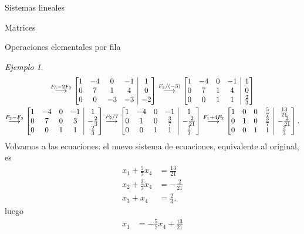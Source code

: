 \documentclass[a4paper,12pt,twoside,spanish,reqno]{amsbook}
\numberwithin{equation}{section}
\theoremstyle{definition}
\theoremstyle{remark}
\newtheorem*{ejemplo*}{Ejemplo}
\begin{document}
\begin{chapter}{Sistemas lineales}
\begin{section}{Matrices}
\begin{subsection}{Operaciones elementales por fila}
\begin{ejemplo*}
\begin{multline*}
                    \stackrel{F_3-2 F_2}{\longrightarrow} 
                    \left[\begin{array}{@{}*{4}{c}|c@{}}  1&-4 &0&-1&1 \\ 0& 7&1& 4&0 \\ 0&0&-3&-3&-2 \end{array}\right] 
                    \stackrel{F_3/(-3)}{\longrightarrow} 
                    \left[\begin{array}{@{}*{4}{c}|c@{}}  1&-4 &0&-1&1 \\ 0& 7&1& 4&0 \\ 0&0&1&1&\frac{2}{3} \end{array}\right]
                    \\
                    \stackrel{F_2- F_3}{\longrightarrow} 
                    \left[\begin{array}{@{}*{4}{c}|c@{}}  1&-4 &0&-1&1 \\ 0& 7&0& 3&-\frac{2}{3} \\ 0&0&1&1&\frac{2}{3} \end{array}\right]
                    \stackrel{F_2/7}{\longrightarrow} 
                    \left[\begin{array}{@{}*{4}{c}|c@{}}  1&-4 &0&-1&1\\ 0& 1&0& \frac37&-\frac{2}{21}\\ 0&0&1&1&\frac{2}{3}\end{array}\right]
                    \stackrel{F_1 +4F_2}{\longrightarrow} 
                    \left[\begin{array}{@{}*{4}{c}|c@{}} 1&0&0&\frac{5}{7}&\frac{13}{21}\\0&1&0&\frac37&-\frac{2}{21} \\ 0&0&1&1&\frac{2}{3}\end{array}\right].
                    \end{multline*}
                    Volvamos a las ecuaciones: el nuevo sistema de ecuaciones, equivalente al original, es
                    \begin{align*}
                    x_1 +\frac{5}{7}x_4 &= \frac{13}{21} \\
                    x_2 + \frac{3}{7}x_4 &=-\frac{2}{21} \\
                    x_3 +x_4 &= \frac{2}{3}, 
                    \end{align*}
                    luego 
                    \begin{align*}
                    x_1  &=-\frac{5}{7}x_4 + \frac{13}{21}\\

\end{align*}
\end{ejemplo*}
\end{subsection}
\end{section}
\end{chapter}
\end{document}
